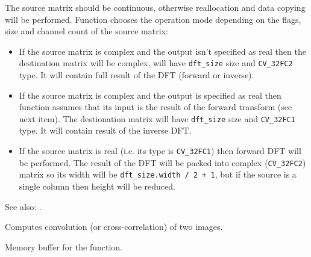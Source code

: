 The source matrix should be continuous, otherwise reallocation and data copying will be performed. Function chooses the operation mode depending on the flags, size and channel count of the source matrix:
\begin{itemize}
  \item If the source matrix is complex and the output isn't specified as real then the destination matrix will be complex, will have \texttt{dft\_size} size and \texttt{CV\_32FC2} type. It will contain full result of the DFT (forward or inverse).
  \item If the source matrix is complex and the output is specified as real then function assumes that its input is the result of the forward transform (see next item). The destionation matrix will have \texttt{dft\_size} size and \texttt{CV\_32FC1} type. It will contain result of the inverse DFT.
  \item If the source matrix is real (i.e. its type is \texttt{CV\_32FC1}) then forward DFT will be performed. The result of the DFT will be packed into complex (\texttt{CV\_32FC2}) matrix so its width will be \texttt{dft\_size.width / 2 + 1}, but if the source is a single column then height will be reduced.
\end{itemize}

See also: .


Computes convolution (or cross-correlation) of two images.


\begin{description}
\end{description}


Memory buffer for the  function.

